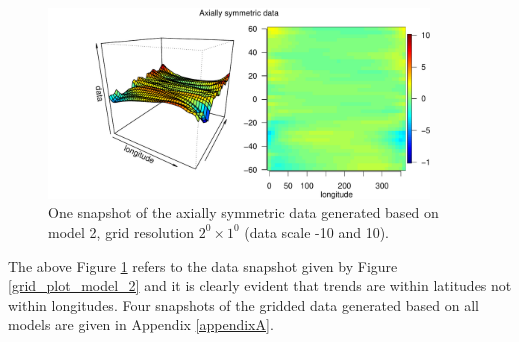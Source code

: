 \begin{figure}[H]
	\begin{center}
		\includegraphics [width=0.9\textwidth ]{graphs/Data_sample_120_model2_density.pdf}
		\caption[One Snapshot of The Axially Symmetric Data Generated Based on Model 2]{One snapshot of the axially symmetric data generated based on model 2, grid resolution $2^0\times 1^0$ (data scale -10 and 10).}
			\label{grid_plot_model2_sim2}
	\end{center}
\end{figure}
The above Figure \ref{grid_plot_model2_sim2} refers to the data snapshot given by Figure \eqref{grid_plot_model_2} and it is clearly evident that trends are within latitudes not within longitudes. Four snapshots of the gridded data generated based on all models are given in Appendix \ref{appendixA}.

%

